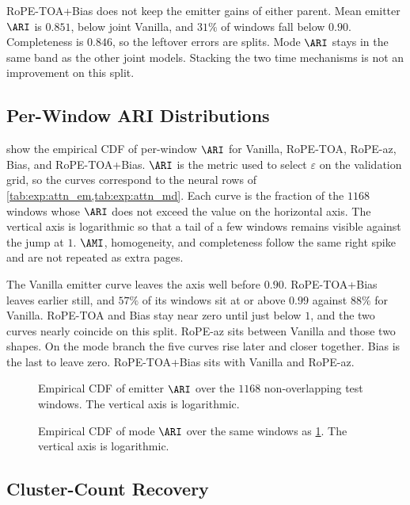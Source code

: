 RoPE-TOA+Bias does not keep the emitter gains of either parent.
Mean emitter $\ARI$ is $0.851$, below joint Vanilla, and $31\%$ of windows fall below $0.90$.
Completeness is $0.846$, so the leftover errors are splits.
Mode $\ARI$ stays in the same band as the other joint models.
Stacking the two time mechanisms is not an improvement on this split.

\subsection{Per-Window ARI Distributions}\label{sec:exp:results:hist}

 show the empirical CDF of per-window $\ARI$ for Vanilla, RoPE-TOA, RoPE-az, Bias, and RoPE-TOA+Bias.
$\ARI$ is the metric used to select $\varepsilon$ on the validation grid, so the curves correspond to the neural rows of \cref{tab:exp:attn_em,tab:exp:attn_md}.
Each curve is the fraction of the $1168$ windows whose $\ARI$ does not exceed the value on the horizontal axis.
The vertical axis is logarithmic so that a tail of a few windows remains visible against the jump at $1$.
$\AMI$, homogeneity, and completeness follow the same right spike and are not repeated as extra pages.

The Vanilla emitter curve leaves the axis well before $0.90$.
RoPE-TOA+Bias leaves earlier still, and $57\%$ of its windows sit at or above $0.99$ against $88\%$ for Vanilla.
RoPE-TOA and Bias stay near zero until just below $1$, and the two curves nearly coincide on this split.
RoPE-az sits between Vanilla and those two shapes.
On the mode branch the five curves rise later and closer together. Bias is the last to leave zero. RoPE-TOA+Bias sits with Vanilla and RoPE-az.

\begin{figure}[tbp]
  \centering
  \caption{Empirical CDF of emitter $\ARI$ over the $1168$ non-overlapping test windows. The vertical axis is logarithmic.}
  \label{fig:exp:hist_em}
\end{figure}

\begin{figure}[tbp]
  \centering
  \caption{Empirical CDF of mode $\ARI$ over the same windows as \cref{fig:exp:hist_em}. The vertical axis is logarithmic.}
  \label{fig:exp:hist_md}
\end{figure}

\subsection{Cluster-Count Recovery}\label{sec:exp:results:kcorr}

